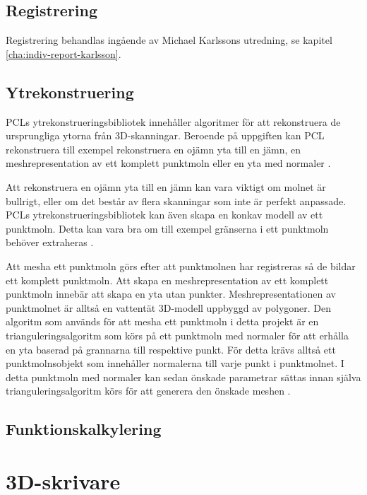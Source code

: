 \subsection{Registrering}
Registrering behandlas ingående av Michael Karlssons utredning, se kapitel \ref{cha:indiv-report-karlsson}.

\subsection{Ytrekonstruering}
PCLs ytrekonstrueringsbibliotek innehåller algoritmer för att rekonstruera de ursprungliga ytorna från 3D-skanningar. Beroende på uppgiften kan PCL rekonstruera till exempel rekonstruera en ojämn yta till en jämn, en meshrepresentation av ett komplett punktmoln eller en yta med normaler \cite{pcl_surface_reconstruction}. 

Att rekonstruera en ojämn yta till en jämn kan vara viktigt om molnet är bullrigt, eller om det består av flera skanningar som inte är perfekt anpassade. PCLs ytrekonstrueringsbibliotek kan även skapa en konkav modell av ett punktmoln. Detta kan vara bra om till exempel gränserna i ett punktmoln behöver extraheras \cite{pcl_surface_reconstruction}.

Att mesha ett punktmoln görs efter att punktmolnen har registreras så de bildar ett komplett punktmoln. Att skapa en meshrepresentation av ett komplett punktmoln innebär att skapa en yta utan punkter. Meshrepresentationen av punktmolnet är alltså en vattentät 3D-modell uppbyggd av polygoner. Den algoritm som används för att mesha ett punktmoln i detta projekt är en trianguleringsalgoritm som körs på ett punktmoln med normaler för att erhålla en yta baserad på grannarna till respektive punkt. För detta krävs alltså ett punktmolnsobjekt som innehåller normalerna till varje punkt i punktmolnet. I detta punktmoln med normaler kan sedan önskade parametrar sättas innan själva trianguleringsalgoritm körs för att generera den önskade meshen \cite{pcl_surface_reconstruction}\cite{pcl_triangulation_algorithm}. 

\subsection{Funktionskalkylering}

\section{3D-skrivare}


